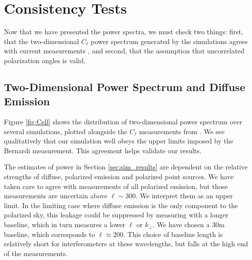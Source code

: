 \section{Consistency Tests}
\label{sec:Consistency}

Now that we have presented the power spectra, we must check two
things: first, that the two-dimensional $C_\ell$ power spectrum generated by the simulations agrees
with current measurements \cite{Bernardi2009}, and second, that the assumption that uncorrelated
polarization angles is valid.

\subsection{Two-Dimensional Power Spectrum and Diffuse Emission}

Figure \ref{fig:Cell} shows the distribution of two-dimensional power spectrum over several
simulations, plotted alongside the $C_\ell$ measurements from \citet{Bernardi2009}. We see
qualitatively that our simulation well obeys the upper limits imposed by the Bernardi measurement.
This agreement helps validate our results.

The estimates of power in Section \ref{sec:sim_results} are dependent on the relative strengths of
diffuse, polarized emission and polarized point sources. We have taken care to agree with
measurements of all polarized emission, but those measurements are uncertain above $\ell\sim300$. We
interpret them as an upper limit. In the limiting case where diffuse emission is the only component
to the polarized sky, this leakage could be suppressed by measuring with a longer baseline, which in
turn measures a lower $\ell$ or $k_\perp$. We have chosen a 30m baseline, which corresponds to
$\ell\approx200$. This choice of baseline length is relatively short for interferometers at these
wavelengths, but falls at the high end of the \citet{Bernardi2009} measurements.

